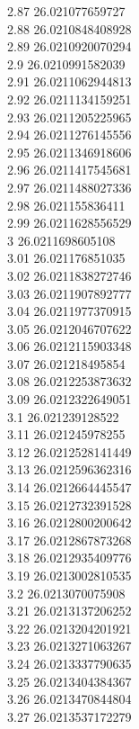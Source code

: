 {2.87	26.021077659727\\
2.88	26.0210848408928\\
2.89	26.0210920070294\\
2.9	26.0210991582039\\
2.91	26.0211062944813\\
2.92	26.0211134159251\\
2.93	26.0211205225965\\
2.94	26.0211276145556\\
2.95	26.0211346918606\\
2.96	26.0211417545681\\
2.97	26.0211488027336\\
2.98	26.021155836411\\
2.99	26.0211628556529\\
3	26.0211698605108\\
3.01	26.021176851035\\
3.02	26.0211838272746\\
3.03	26.0211907892777\\
3.04	26.0211977370915\\
3.05	26.0212046707622\\
3.06	26.0212115903348\\
3.07	26.021218495854\\
3.08	26.0212253873632\\
3.09	26.0212322649051\\
3.1	26.021239128522\\
3.11	26.021245978255\\
3.12	26.0212528141449\\
3.13	26.0212596362316\\
3.14	26.0212664445547\\
3.15	26.0212732391528\\
3.16	26.0212800200642\\
3.17	26.0212867873268\\
3.18	26.0212935409776\\
3.19	26.0213002810535\\
3.2	26.0213070075908\\
3.21	26.0213137206252\\
3.22	26.0213204201921\\
3.23	26.0213271063267\\
3.24	26.0213337790635\\
3.25	26.0213404384367\\
3.26	26.0213470844804\\
3.27	26.0213537172279\\
}
